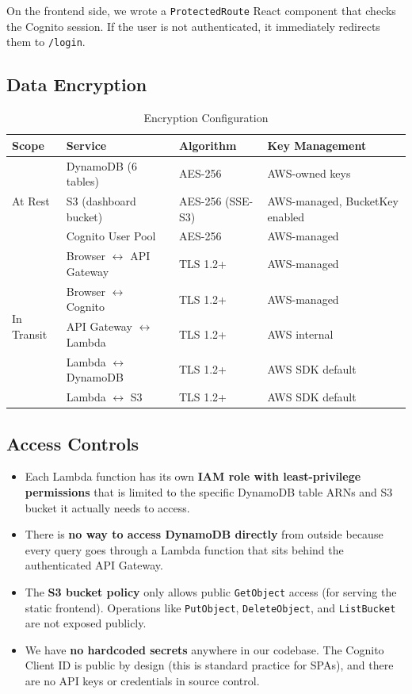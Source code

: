 \documentclass[11pt,a4paper]{article}
\begin{document}
On the frontend side, we wrote a \texttt{ProtectedRoute} React component that checks the Cognito session. If the user is not authenticated, it immediately redirects them to \texttt{/login}.

\subsection{Data Encryption}

\begin{table}[H]
\centering
\begin{tabular}{llll}
\toprule
\textbf{Scope} & \textbf{Service} & \textbf{Algorithm} & \textbf{Key Management} \\
\midrule
\multirow{3}{*}{At Rest} & DynamoDB (6 tables) & AES-256 & AWS-owned keys \\
 & S3 (dashboard bucket) & AES-256 (SSE-S3) & AWS-managed, BucketKey enabled \\
 & Cognito User Pool & AES-256 & AWS-managed \\
\midrule
\multirow{5}{*}{In Transit} & Browser $\leftrightarrow$ API Gateway & TLS 1.2+ & AWS-managed \\
 & Browser $\leftrightarrow$ Cognito & TLS 1.2+ & AWS-managed \\
 & API Gateway $\leftrightarrow$ Lambda & TLS 1.2+ & AWS internal \\
 & Lambda $\leftrightarrow$ DynamoDB & TLS 1.2+ & AWS SDK default \\
 & Lambda $\leftrightarrow$ S3 & TLS 1.2+ & AWS SDK default \\
\bottomrule
\end{tabular}
\caption{Encryption Configuration}
\label{tab:encryption}
\end{table}

\subsection{Access Controls}

\begin{itemize}[leftmargin=2em]
    \item Each Lambda function has its own \textbf{IAM role with least-privilege permissions} that is limited to the specific DynamoDB table ARNs and S3 bucket it actually needs to access.
    \item There is \textbf{no way to access DynamoDB directly} from outside because every query goes through a Lambda function that sits behind the authenticated API Gateway.
    \item The \textbf{S3 bucket policy} only allows public \texttt{GetObject} access (for serving the static frontend). Operations like \texttt{PutObject}, \texttt{DeleteObject}, and \texttt{ListBucket} are not exposed publicly.
    \item We have \textbf{no hardcoded secrets} anywhere in our codebase. The Cognito Client ID is public by design (this is standard practice for SPAs), and there are no API keys or credentials in source control.
\end{itemize}
\end{document}

